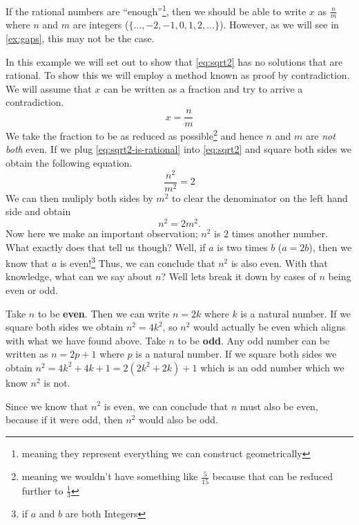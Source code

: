 \documentclass[../../templates/section]{subfiles}
\begin{document}
If the rational numbers are ``enough''\footnote{meaning they represent
everything we can construct geometrically}, then we should be able to write $x$
as $\frac{n}{m}$ where $n$ and $m$ are integers ({$\{\ldots, -2, -1,
0, 1, 2, \ldots\}$}).
However, as we will see in \cref{ex:gaps}, this may not be the case.

\begin{example}\label{ex:gaps}
In this example we will set out to show that \cref{eq:sqrt2} has no
solutions that are rational. To show this we will employ a method known as
proof by contradiction. We will assume that $x$ can be written as a fraction
and try to arrive a contradiction.
\begin{equation}\label{eq:sqrt2-is-rational}
    x = \frac{n}{m}
\end{equation}
We take the fraction to be as reduced as possible\footnote{meaning we
wouldn't have something like $\frac{5}{15}$ because that can be reduced further
to $\frac{1}{3}$} and hence $n$ and $m$ are \emph{not both} even. If we plug
\cref{eq:sqrt2-is-rational} into \cref{eq:sqrt2} and square both sides we
obtain the following equation.
\begin{equation}
    \frac{n^2}{m^2} = 2
\end{equation}
We can then muliply both sides by $m^2$ to clear the denominator on the left
hand side and obtain
\begin{equation}\label{eq:oddeven}
    n^2 = 2m^2.
\end{equation}
Now here we make an important observation; $n^2$ is $2$ times another number.
What exactly does that tell us though? Well, if $a$ is two times $b$ ($a =
2b$), then we know that $a$ is even!\footnote{if $a$ and $b$ are both Integers}
Thus, we can conclude that $n^2$ is also even. With that knowledge, what can we
say about $n$? Well lets break it down by cases of $n$ being even or odd.
\begin{multicols}{2}
Take $n$ to be \textbf{even}. Then we can write $n = 2k$ where $k$ is a natural
number. If we square both sides we obtain $n^2 = 4k^2$, so $n^2$ would actually
be even which aligns with what we have found above.
\vfill\null
\columnbreak
Take $n$ to be \textbf{odd}. Any odd number can be written as $n = 2p + 1$
where $p$ is a natural number. If we square both sides we obtain $n^2 = 4k^2 +
4k + 1 = 2(2k^2 + 2k) + 1$ which is an odd number which we know $n^2$ is not.
\end{multicols}
Since we know that $n^2$ is even, we can conclude that $n$ must also be even,
because if it were odd, then $n^2$ would also be odd.


\end{example}
\end{document}
